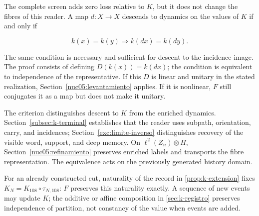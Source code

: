 The complete screen adds zero loss relative to \(K\), but it does not change the fibres of this reader. A map \(d:X\to X\) descends to dynamics on the values of \(K\) if and only if

\[
k(x)=k(y)\Longrightarrow k(d x)=k(d y).
\]

The same condition is necessary and sufficient for descent to the incidence image. The proof consists of defining \(D(k(x))=k(dx)\); the condition is equivalent to independence of the representative. If this \(D\) is linear and unitary in the stated realization, Section~\ref{nuc05:levantamiento} applies. If it is nonlinear, \(F\) still conjugates it as a map but does not make it unitary.

The criterion distinguishes descent to \(K\) from the enriched dynamics. Section~\ref{subsec:k-terminal} establishes that the reader uses subpath, orientation, carry, and incidences; Section~\ref{exc:limite-inverso} distinguishes recovery of the visible word, support, and deep memory. On \(\ell^2(Z_n)\otimes H\), Section~\ref{nuc05:refinamiento} preserves enriched labels and transports the fibre representation. The equivalence acts on the previously generated history domain.

For an already constructed cut, naturality of the record in \cref{prop:k-extension} fixes \(K_N=K_{108}\circ\tau_{N,108}\): \(F\) preserves this naturality exactly. A sequence of new events may update \(K\); the additive or affine composition in \cref{sec:k-registro} preserves independence of partition, not constancy of the value when events are added.
